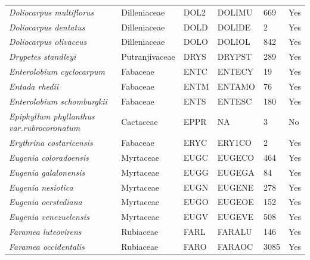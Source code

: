 \documentclass[11pt]{article}
\begin{document}
\begin{longtable}{@{}llllll@{}}
\textit{Doliocarpus multiflorus}                      & Dilleniaceae     & DOL2   & DOLIMU & 669             & Yes       \\
\textit{Doliocarpus dentatus}                         & Dilleniaceae     & DOLD   & DOLIDE & 2               & Yes       \\
\textit{Doliocarpus olivaceus}                        & Dilleniaceae     & DOLO   & DOLIOL & 842             & Yes       \\
\textit{Drypetes standleyi}                           & Putranjivaceae   & DRYS   & DRYPST & 289             & Yes       \\
\textit{Enterolobium cyclocarpum}                     & Fabaceae         & ENTC   & ENTECY & 19              & Yes       \\
\textit{Entada rhedii}                                & Fabaceae         & ENTM   & ENTAMO & 76              & Yes       \\
\textit{Enterolobium schomburgkii}                    & Fabaceae         & ENTS   & ENTESC & 180             & Yes       \\
\textit{Epiphyllum phyllanthus var.rubrocoronatum} & Cactaceae        & EPPR   & NA     & 3               & No        \\
\textit{Erythrina costaricensis}                      & Fabaceae         & ERYC   & ERY1CO & 2               & Yes       \\
\textit{Eugenia coloradoensis}                        & Myrtaceae        & EUGC   & EUGECO & 464             & Yes       \\
\textit{Eugenia galalonensis}                         & Myrtaceae        & EUGG   & EUGEGA & 84              & Yes       \\
\textit{Eugenia nesiotica}                            & Myrtaceae        & EUGN   & EUGENE & 278             & Yes       \\
\textit{Eugenia oerstediana}                          & Myrtaceae        & EUGO   & EUGEOE & 152             & Yes       \\
\textit{Eugenia venezuelensis}                        & Myrtaceae        & EUGV   & EUGEVE & 508             & Yes       \\
\textit{Faramea luteovirens}                          & Rubiaceae        & FARL   & FARALU & 146             & Yes       \\
\textit{Faramea occidentalis}                         & Rubiaceae        & FARO   & FARAOC & 3085            & Yes       \\

\end{longtable}
\end{document}
